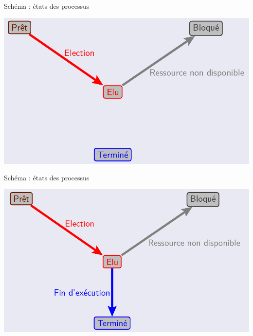 \documentclass[10pt]{beamer}
\begin{document}
\begin{frame}
	\mframe{\Processus}
	\begin{block}{Schéma : états des processus}
			\begin{center}
		\includegraphics[scale=0.25]{../../Archi_Materielle/data/etats_processus_3}
		\end{center}
	\end{block}
\end{frame}

\begin{frame}
	\mframe{\Processus}
	\begin{block}{Schéma : états des processus}
			\begin{center}
		\includegraphics[scale=0.25]{../../Archi_Materielle/data/etats_processus_4}
		\end{center}
	\end{block}
\end{frame}
\end{document}
